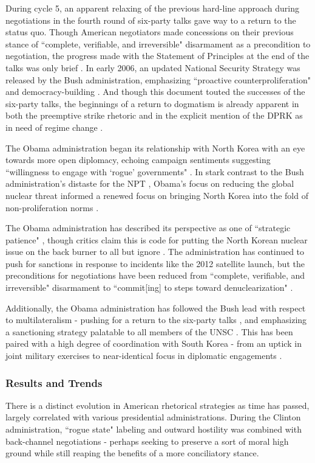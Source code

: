 \documentclass{article}
\begin{document}
During cycle 5, an apparent relaxing of the previous hard-line approach during negotiations in the fourth round of six-party talks gave way to a return to the status quo. Though American negotiators made concessions on their previous stance of ``complete, verifiable, and irreversible" disarmament as a precondition to negotiation, the progress made with the Statement of Principles at the end of the talks was only brief \cite{huntley}. In early 2006, an updated National Security Strategy was released by the Bush administration, emphasizing ``proactive counterproliferation" and democracy-building \cite{nss06}. And though this document touted the successes of the six-party talks, the beginnings of a return to dogmatism is already apparent in both the preemptive strike rhetoric and in the explicit mention of the DPRK as in need of regime change \cite{nss06}.

The Obama administration began its relationship with North Korea with an eye towards more open diplomacy, echoing campaign sentiments suggesting ``willingness to engage with `rogue' governments" \cite{crs13}. In stark contrast to the Bush administration's distaste for the NPT \cite{huntley}, Obama's focus on reducing the global nuclear threat informed a renewed focus on bringing North Korea into the fold of non-proliferation norms \cite{crs13}.

The Obama administration has described its perspective as one of ``strategic patience" \cite{crs13}, though critics claim this is code for putting the North Korean nuclear issue on the back burner to all but ignore \cite{green}. The administration has continued to push for sanctions in response to incidents like the 2012 satellite launch, but the preconditions for negotiations have been reduced from ``complete, verifiable, and irreversible" disarmament \cite{huntley} to ``commit[ing] to steps toward denuclearization" \cite{crs13}.

Additionally, the Obama administration has followed the Bush lead with respect to multilateralism - pushing for a return to the six-party talks \cite{crs13}, and emphasizing a sanctioning strategy palatable to all members of the UNSC \cite{green}. This has been paired with a high degree of coordination with South Korea - from an uptick in joint military exercises to near-identical focus in diplomatic engagements \cite{crs13}.

\subsubsection{Results and Trends}
There is a distinct evolution in American rhetorical strategies as time has passed, largely correlated with various presidential administrations. During the Clinton administration, ``rogue state" labeling and outward hostility was combined with back-channel negotiations - perhaps seeking to preserve a sort of moral high ground while still reaping the benefits of a more conciliatory stance.
\end{document}
